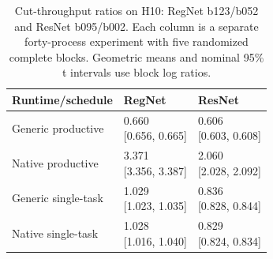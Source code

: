 \begin{table}[t]
\centering
\caption{Cut-throughput ratios on H10: RegNet b123/b052 and ResNet b095/b002. Each column is a separate forty-process experiment with five randomized complete blocks. Geometric means and nominal 95\% t intervals use block log ratios.}
\label{tab:scheduling}
\begingroup\small\setlength{\tabcolsep}{3pt}
\begin{tabular}{lll}
\toprule
Runtime/schedule & RegNet & ResNet \\
\midrule
Generic productive & \shortstack{{0.660}\\{[0.656, 0.665]}} & \shortstack{{0.606}\\{[0.603, 0.608]}} \\
Native productive & \shortstack{{3.371}\\{[3.356, 3.387]}} & \shortstack{{2.060}\\{[2.028, 2.092]}} \\
Generic single-task & \shortstack{{1.029}\\{[1.023, 1.035]}} & \shortstack{{0.836}\\{[0.828, 0.844]}} \\
Native single-task & \shortstack{{1.028}\\{[1.016, 1.040]}} & \shortstack{{0.829}\\{[0.824, 0.834]}} \\
\bottomrule
\end{tabular}
\endgroup
\end{table}
